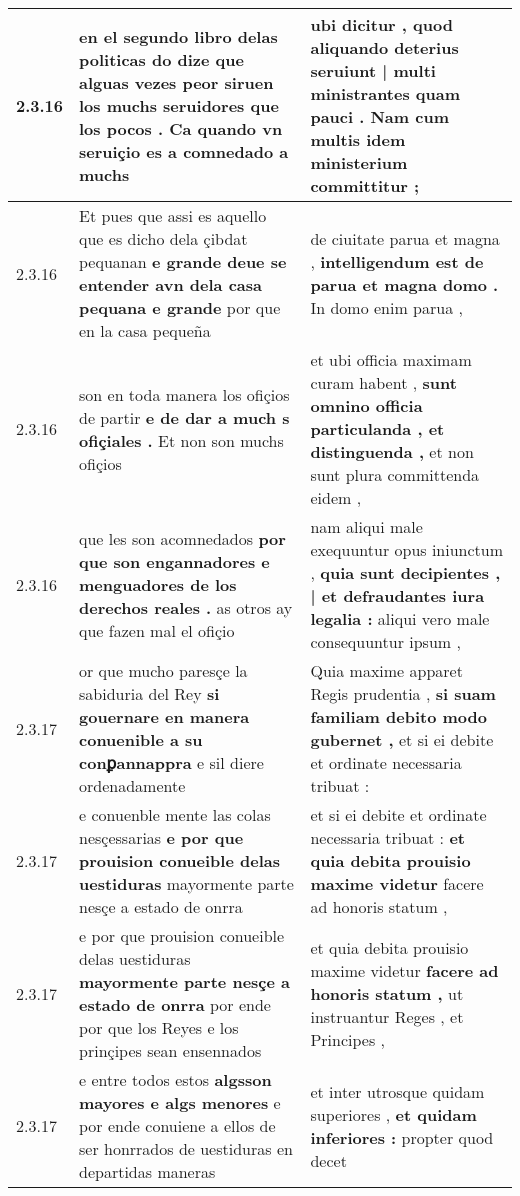\begin{tabular}{|p{1cm}|p{6.5cm}|p{6.5cm}|}
2.3.16 & en el segundo libro delas politicas \textbf{ do dize que alguas vezes peor siruen los muchs seruidores que los pocos . } Ca quando vn seruiçio es a comnedado a muchs & ubi dicitur , \textbf{ quod aliquando deterius seruiunt | multi ministrantes quam pauci . } Nam cum multis idem ministerium committitur ; \\\hline
2.3.16 & Et pues que assi es aquello que es dicho dela çibdat pequanan \textbf{ e grande deue se entender avn dela casa pequana e grande } por que en la casa pequeña & de ciuitate parua et magna , \textbf{ intelligendum est de parua et magna domo . } In domo enim parua , \\\hline
2.3.16 & son en toda manera los ofiçios de partir \textbf{ e de dar a much s ofiçiales . } Et non son muchs ofiçios & et ubi officia maximam curam habent , \textbf{ sunt omnino officia particulanda , et distinguenda , } et non sunt plura committenda eidem , \\\hline
2.3.16 & que les son acomnedados \textbf{ por que son engannadores e menguadores de los derechos reales . } as otros ay que fazen mal el ofiçio & nam aliqui male exequuntur opus iniunctum , \textbf{ quia sunt decipientes , | et defraudantes iura legalia : } aliqui vero male consequuntur ipsum , \\\hline
2.3.17 & or que mucho paresçe la sabiduria del Rey \textbf{ si gouernare en manera conuenible a su conꝑannappra } e sil diere ordenadamente & Quia maxime apparet Regis prudentia , \textbf{ si suam familiam debito modo gubernet , } et si ei debite et ordinate necessaria tribuat : \\\hline
2.3.17 & e conuenble mente las colas nesçessarias \textbf{ e por que prouision conueible delas uestiduras } mayormente parte nesçe a estado de onrra & et si ei debite et ordinate necessaria tribuat : \textbf{ et quia debita prouisio maxime videtur } facere ad honoris statum , \\\hline
2.3.17 & e por que prouision conueible delas uestiduras \textbf{ mayormente parte nesçe a estado de onrra } por ende por que los Reyes e los prinçipes sean ensennados & et quia debita prouisio maxime videtur \textbf{ facere ad honoris statum , } ut instruantur Reges , et Principes , \\\hline
2.3.17 & e entre todos estos \textbf{ algsson mayores e algs menores } e por ende conuiene a ellos de ser honrrados de uestiduras en departidas maneras & et inter utrosque quidam superiores , \textbf{ et quidam inferiores : } propter quod decet \\\hline

\end{tabular}
